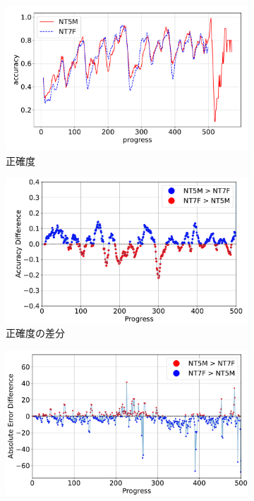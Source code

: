 \begin{figure}[t]
\centering
\begin{subfigure}[b]{0.49\linewidth}
    \includegraphics[width=\linewidth]{pdf/compare/NT5M_and_NT7F/accuracy.pdf}
    \caption{正確度}
    \label{fig:NT5M_and_NT7F_accuracy}
\end{subfigure}
\begin{subfigure}[b]{0.49\linewidth}
    \includegraphics[width=\linewidth]{pdf/compare/NT5M_and_NT7F/acc_diff_plot.pdf}
    \caption{正確度の差分}
    \label{fig:NT5M_and_NT7F_acc_diff}
\end{subfigure}
\begin{subfigure}[b]{0.49\linewidth}
    \includegraphics[width=\linewidth]{pdf/compare/NT5M_and_NT7F/error_abs_diff_plot.pdf}

\end{subfigure}
\end{figure}
